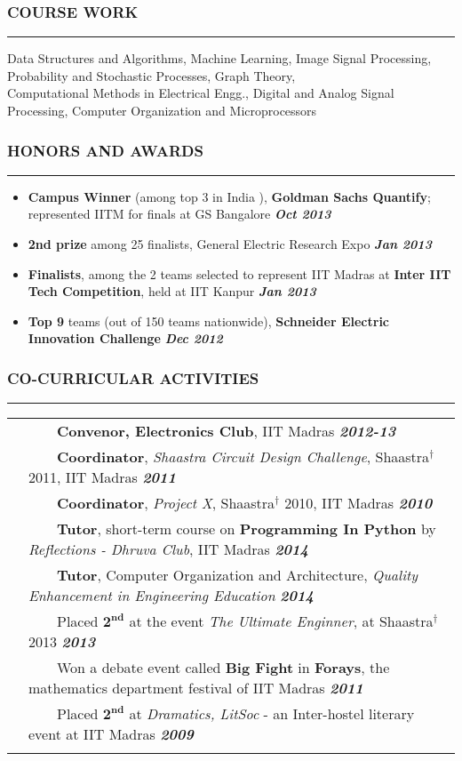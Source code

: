\documentclass[10pt,a4paper,English]{article}
\newcommand{\lv}{\color{table-border}\vrule}
\newcommand{\lh}{\arrayrulecolor{table-border}}
\newcommand\roottitle[1]{\vspace{-4mm}\subsubsection*{\uppercase{#1}}\vspace{-0.3em}\nopagebreak[4]\hrule}
\newcommand\itemyear[1]{\hfill \textbf{\emph{\color{itemyear} #1}}}
\newcommand\itemenv{\setlength\itemsep{0.5pt} \addtolength{\itemindent}{-5mm}\vspace{-1.5mm}}
\newcommand{\tabitem}{~~\llap{\textbullet}~~}
\begin{document}
\roottitle{Course Work}
\vspace{2mm}
\noindent Data Structures and Algorithms, Machine Learning, Image Signal Processing, Probability and Stochastic Processes, Graph Theory, \\ 
Computational Methods in Electrical Engg., Digital and Analog Signal Processing, Computer Organization and Microprocessors
\vspace{2mm}

\roottitle{Honors and Awards}
\vspace{4mm}
\begin{itemize} \itemenv
    \item \textbf{Campus Winner} (among top {3} in India ), \textbf{Goldman Sachs Quantify}; represented IITM for finals at GS Bangalore \itemyear{Oct 2013}
    \item \textbf{2nd prize} among 25 finalists, General Electric Research Expo \itemyear{Jan 2013}
    \item \textbf{Finalists}, among the 2 teams selected to represent IIT Madras at \textbf{Inter IIT Tech Competition}, held at IIT Kanpur \itemyear{Jan 2013}
    \item \textbf{Top 9} teams (out of 150 teams nationwide), \textbf{Schneider Electric Innovation Challenge} \itemyear{ Dec 2012 } 
\end{itemize}

\roottitle{Co-curricular Activities}
\renewcommand{\arraystretch}{1.2}
\setlength\tabcolsep{5pt}
\begin{tabularx}{\textwidth}{ !{\lv} >{} c !{\lv} X !{\lv} }
& \tabitem \textbf{Convenor, Electronics Club}, IIT Madras \itemyear{2012-13}\\
& \tabitem \textbf{Coordinator}, \emph{Shaastra Circuit Design Challenge}, Shaastra$^\dag$ 2011, IIT Madras \itemyear{2011} \\
& \tabitem \textbf{Coordinator}, \emph{Project X}, Shaastra$^\dag$ 2010, IIT Madras \itemyear{2010} \\ 
\lh \hline
& \tabitem \textbf{Tutor}, short-term course on \textbf{Programming In Python} by \emph{Reflections - Dhruva Club}, IIT Madras \itemyear{ 2014 } \\
& \tabitem \textbf{Tutor}, Computer Organization and Architecture, \emph{Quality Enhancement in Engineering Education} \itemyear{2014} \\
& \tabitem Placed $\mathbf{2^{nd}}$ at the event \emph{The Ultimate Enginner}, at Shaastra$^\dag$ 2013 \itemyear{2013} \\ 
\hline
& \tabitem Won a debate event called \textbf{Big Fight} in \textbf{Forays}, the mathematics department festival of IIT Madras \itemyear{2011} \\
& \tabitem Placed $\mathbf{2^{nd}}$ at \emph{Dramatics, LitSoc} - an Inter-hostel literary event at IIT Madras \itemyear{2009} \\ 
\lh \hline
\end{tabularx}
\vspace{2mm}

\end{document}
